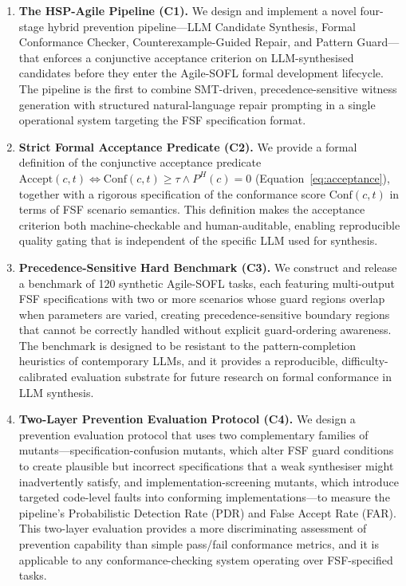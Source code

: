 \begin{enumerate}

\item \textbf{The HSP-Agile Pipeline (C1).}
We design and implement a novel four-stage hybrid prevention pipeline—LLM Candidate Synthesis, Formal Conformance Checker, Counterexample-Guided Repair, and Pattern Guard—that enforces a conjunctive acceptance criterion on LLM-synthesised candidates before they enter the Agile-SOFL formal development lifecycle.  The pipeline is the first to combine SMT-driven, precedence-sensitive witness generation with structured natural-language repair prompting in a single operational system targeting the FSF specification format.

\item \textbf{Strict Formal Acceptance Predicate (C2).}
We provide a formal definition of the conjunctive acceptance predicate $\mathrm{Accept}(c, t) \iff \mathrm{Conf}(c, t) \geq \tau \wedge P^H(c) = 0$ (Equation~\eqref{eq:acceptance}), together with a rigorous specification of the conformance score $\mathrm{Conf}(c, t)$ in terms of FSF scenario semantics.  This definition makes the acceptance criterion both machine-checkable and human-auditable, enabling reproducible quality gating that is independent of the specific LLM used for synthesis.

\item \textbf{Precedence-Sensitive Hard Benchmark (C3).}
We construct and release a benchmark of 120 synthetic Agile-SOFL tasks, each featuring multi-output FSF specifications with two or more scenarios whose guard regions overlap when parameters are varied, creating precedence-sensitive boundary regions that cannot be correctly handled without explicit guard-ordering awareness.  The benchmark is designed to be resistant to the pattern-completion heuristics of contemporary LLMs, and it provides a reproducible, difficulty-calibrated evaluation substrate for future research on formal conformance in LLM synthesis.

\item \textbf{Two-Layer Prevention Evaluation Protocol (C4).}
We design a prevention evaluation protocol that uses two complementary families of mutants—specification-confusion mutants, which alter FSF guard conditions to create plausible but incorrect specifications that a weak synthesiser might inadvertently satisfy, and implementation-screening mutants, which introduce targeted code-level faults into conforming implementations—to measure the pipeline's Probabilistic Detection Rate (PDR) and False Accept Rate (FAR).  This two-layer evaluation provides a more discriminating assessment of prevention capability than simple pass/fail conformance metrics, and it is applicable to any conformance-checking system operating over FSF-specified tasks.


\end{enumerate}
